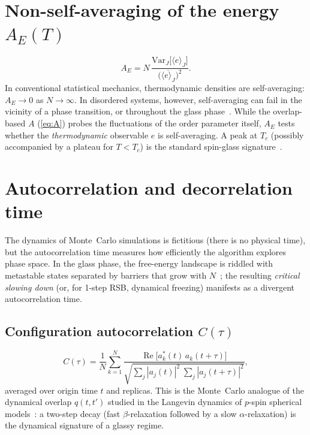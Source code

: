 \documentclass[11pt,a4paper]{article}
\newcommand{\avg}[1]{\langle #1 \rangle}
\newcommand{\avgJ}[1]{\overline{#1}}
\newcommand{\re}{\operatorname{Re}}
\begin{document}
\section{Non-self-averaging of the energy $A_E(T)$}\label{sec:nsa_e}

\begin{equation}
  A_E = N\,\frac{\mathrm{Var}_J\!\bigl[\avg{e}_J\bigr]}
                 {\bigl(\avgJ{\avg{e}_J}\bigr)^2}.
\end{equation}
In conventional statistical mechanics, thermodynamic densities
are self-averaging: $A_E \to 0$ as $N \to \infty$.  In
disordered systems, however, self-averaging can fail in the
vicinity of a phase transition, or throughout the glass
phase~\cite{Wiseman1995,AharonyHarris1996}.
While the overlap-based $A$ (\cref{eq:A}) probes the fluctuations
of the order parameter itself, $A_E$ tests whether the
\emph{thermodynamic} observable $e$ is self-averaging.
A peak at $T_c$ (possibly accompanied by a plateau for
$T < T_c$) is the standard spin-glass
signature~\cite{MPV1987}.

\section{Autocorrelation and decorrelation time}

The dynamics of Monte~Carlo simulations is fictitious
(there is no physical time), but the autocorrelation time
measures how efficiently the algorithm explores phase space.
In the glass phase, the free-energy landscape is riddled with
metastable states separated by barriers that grow with
$N$~\cite{CrisantiSommers1992,MPV1987}; the resulting
\emph{critical slowing down} (or, for 1-step RSB, dynamical
freezing) manifests as a divergent autocorrelation time.

\subsection{Configuration autocorrelation $C(\tau)$}
\begin{equation}
  C(\tau)
  = \frac{1}{N}\sum_{k=1}^{N}
    \frac{\re\bigl[a_k^*(t)\,a_k(t+\tau)\bigr]}
         {\sqrt{\sum_j |a_j(t)|^2 \;\sum_j |a_j(t+\tau)|^2}},
\end{equation}
averaged over origin time $t$ and replicas.  This is the
Monte~Carlo analogue of the dynamical overlap $q(t,t')$
studied in the Langevin dynamics of $p$-spin spherical
models~\cite{CrisantiSommers1992}:  a two-step decay
(fast $\beta$-relaxation followed by a slow
$\alpha$-relaxation) is the dynamical signature of a
glassy regime.
\end{document}
